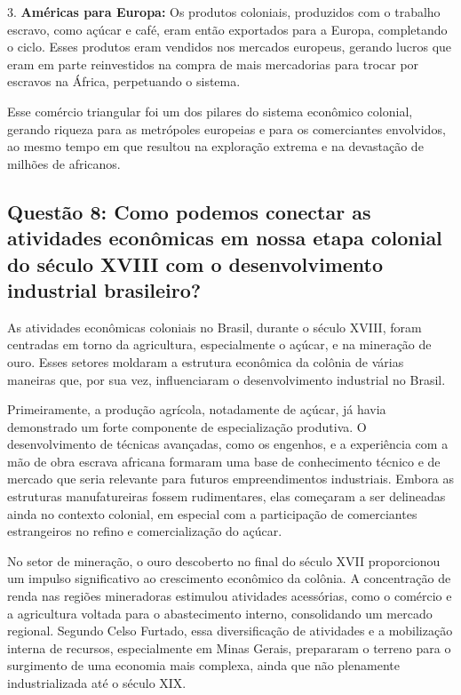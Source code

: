 \documentclass[a4paper,12pt]{article}[abntex2]
\begin{document}
3. \textbf{Américas para Europa:} Os produtos coloniais, produzidos com o trabalho escravo, como açúcar e café, eram então exportados para a Europa, completando o ciclo. Esses produtos eram vendidos nos mercados europeus, gerando lucros que eram em parte reinvestidos na compra de mais mercadorias para trocar por escravos na África, perpetuando o sistema.

Esse comércio triangular foi um dos pilares do sistema econômico colonial, gerando riqueza para as metrópoles europeias e para os comerciantes envolvidos, ao mesmo tempo em que resultou na exploração extrema e na devastação de milhões de africanos.

\subsection{\textbf{Questão 8: Como podemos conectar as atividades econômicas em nossa etapa colonial do século XVIII com o desenvolvimento industrial brasileiro?}}

As atividades econômicas coloniais no Brasil, durante o século XVIII, foram centradas em torno da agricultura, especialmente o açúcar, e na mineração de ouro. Esses setores moldaram a estrutura econômica da colônia de várias maneiras que, por sua vez, influenciaram o desenvolvimento industrial no Brasil.

Primeiramente, a produção agrícola, notadamente de açúcar, já havia demonstrado um forte componente de especialização produtiva. O desenvolvimento de técnicas avançadas, como os engenhos, e a experiência com a mão de obra escrava africana formaram uma base de conhecimento técnico e de mercado que seria relevante para futuros empreendimentos industriais. Embora as estruturas manufatureiras fossem rudimentares, elas começaram a ser delineadas ainda no contexto colonial, em especial com a participação de comerciantes estrangeiros no refino e comercialização do açúcar.

No setor de mineração, o ouro descoberto no final do século XVII proporcionou um impulso significativo ao crescimento econômico da colônia. A concentração de renda nas regiões mineradoras estimulou atividades acessórias, como o comércio e a agricultura voltada para o abastecimento interno, consolidando um mercado regional. Segundo Celso Furtado, essa diversificação de atividades e a mobilização interna de recursos, especialmente em Minas Gerais, prepararam o terreno para o surgimento de uma economia mais complexa, ainda que não plenamente industrializada até o século XIX. 
\end{document}
